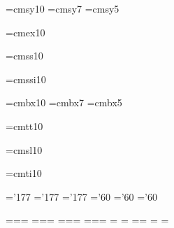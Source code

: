 \font\tensy=cmsy10 %
\font\sevensy=cmsy7
\font\fivesy=cmsy5

\font\tenex=cmex10 %

\font\preloaded=cmss10 %

\font\preloaded=cmssi10 %

\font\tenbf=cmbx10 %
\font\sevenbf=cmbx7
\font\fivebf=cmbx5

\font\tentt=cmtt10 %


\font\tensl=cmsl10 %

\font\tenit=cmti10 %









\let\preloaded=\undefined %

\skewchar\teni='177 \skewchar\seveni='177 \skewchar\fivei='177
\skewchar\tensy='60 \skewchar\sevensy='60 \skewchar\fivesy='60

=\tenrm {}=\sevenrm {}=\fiverm
\def\rm{\fam\z@\tenrm}
=\teni {}=\seveni {}=\fivei
\def\mit{\fam\@ne} \def\oldstyle{\fam\@ne\teni}
=\tensy {}=\sevensy {}=\fivesy
\def\cal{\fam\tw@}
=\tenex {}=\tenex {}=\tenex
\newfam\itfam \def\it{\fam\itfam\tenit} %
\textfont\itfam=\tenit
\newfam\slfam \def\sl{\fam\slfam\tensl} %
\textfont\slfam=\tensl
\newfam\bffam \def\bf{\fam\bffam\tenbf} %
\textfont\bffam=\tenbf \scriptfont\bffam=\sevenbf
\scriptscriptfont\bffam=\fivebf
\newfam\ttfam \def\tt{\fam\ttfam\tentt} %
\textfont\ttfam=\tentt

